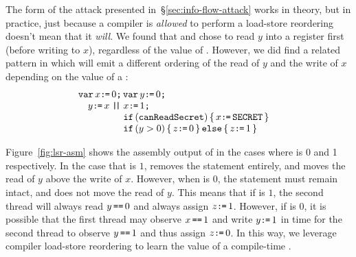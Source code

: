 The form of the attack presented in~\S\ref{sec:info-flow-attack} works in
theory, but in practice, just because a compiler is \emph{allowed} to perform a
load-store reordering doesn't mean that it \emph{will}.
We found that {\GCC} and {\CLANG} chose to read $y$ into a
register first (before writing to $x$), regardless of the value of
{\SEC}.
However, we did find a related pattern in which {\GCC} will emit a
different ordering of the read of $y$ and the write of $x$ depending
on the value of a {\SEC}:
\[\begin{array}[t]{@{}l}
  \VAR x\GETS0\SEMI \VAR y\GETS0\SEMI\\\quad
    y\GETS x
  \PAR\begin{array}[t]{@{}l}
    x\GETS 1\SEMI\\
    \IF(\texttt{canReadSecret})\THEN x\GETS\SEC\FI\\
    \IF(y > 0)\THEN z\GETS 0 \ELSE z\GETS 1\FI
\end{array}\end{array}\]

Figure~\ref{fig:lsr-asm} shows the assembly output of {\GCC} in the cases
where {\SEC} is 0 and 1 respectively.
In the case that {\SEC} is $1$, {\GCC} removes the \IF
statement entirely, and moves the read of $y$ above the write of $x$.
However, when {\SEC} is $0$, the \IF statement must remain
intact, and {\GCC} does not move the read of $y$.
This means that if {\SEC} is $1$, the second thread will always
read $y\,\texttt{==}\,0$ and always assign $z\texttt{:}\mkern-1mu\texttt{=}\,1$.
However, if {\SEC} is $0$, it is possible that the first thread
may observe $x\,\texttt{==}\,1$ and write $y\texttt{:}\mkern-1mu\texttt{=}\,1$ in time for the second thread
to observe $y\,\texttt{==}\,1$ and thus assign $z\texttt{:}\mkern-1mu\texttt{=}\,0$.
In this way, we leverage compiler load-store reordering to learn the value of
a compile-time {\SEC}.

